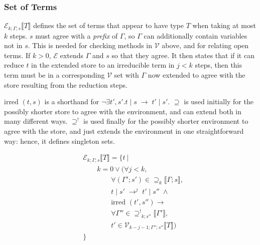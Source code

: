 \documentclass[9pt]{sigplanconf}
\newcommand{\gap}{\quad\quad}
\newcommand{\reduces}{\;\rightarrow\;}
\newcommand{\reduction}[4]{#1 \operatorname{|} #2 \reduces #3 \operatorname{|} #4}
\newcommand{\relv}[4]{\mathcal{V}_{#1;#2;#3}\llbracket#4\rrbracket}
\newcommand{\rele}[4]{\mathcal{E}_{#1;#2;#3}\llbracket#4\rrbracket}
\newcommand{\rels}[3]{\mathcal{\supseteq}_{#1}\llbracket#2;#3\rrbracket}
\newcommand{\relg}[3]{\mathcal{\supseteq^!}_{#1;#2}\llbracket#3\rrbracket}
\newcommand{\irred}[2]{\text{irred }(#1,#2)}
\newcommand{\andl}{\;\wedge\;}
\newcommand{\orl}{\vee}
\newcommand{\impliesl}{\rightarrow}
\newcommand{\reductionl}[5]{#1 \operatorname{|} #2 \;\rightarrow^{#5}\; #3 \operatorname{|} #4}
\begin{document}
\subsubsection{Set of Terms}
$\rele k \Gamma s T$ defines the set of terms that appear to have type
$T$ when taking at most $k$ steps. $s$ must agree with a {\it prefix}
of $\Gamma$, so $\Gamma$ can additionally contain variables not in
$s$. This is needed for checking methods in $\mathcal{V}$ above, and
for relating open terms. If $k > 0$, $\mathcal{E}$ extends $\Gamma$
and $s$ so that they agree. It then states that if it can reduce $t$
in the extended store to an irreducible term in $j < k$ steps, then
this term must be in a corresponding $\mathcal{V}$ set with $\Gamma$
now extended to agree with the store resulting from the reduction
steps.

$\irred {t} {s}$ is a shorthand for $\neg\exists t', s'. \reduction t s
{t'} {s'}$. $\mathcal{\supseteq}$ is used initially for the possibly
shorter store to agree with the environment, and can extend both in
many different ways. $\mathcal{\supseteq}^!$ is used finally for the
possibly shorter environment to agree with the store, and just extends
the environment in one straightforward way: hence, it defines
singleton sets.

\begin{align*}
&\rele k \Gamma s T = \{ t \ |\\
&\gap k = 0 \orl (\forall j < k,\\
&\gap\gap \forall (\Gamma'; s') \in \rels k \Gamma s ,\\
&\gap\gap \reductionl t {s'} {t'} {s''} j \andl\\
&\gap\gap \irred {t'} {s''} \impliesl\\
&\gap\gap \forall \Gamma'' \in \relg k {s''} {\Gamma'} ,\\
&\gap\gap {t'} \in \relv {k-j-1} {\Gamma''} {s''} T)\\
&\}
\end{align*}
\end{document}

